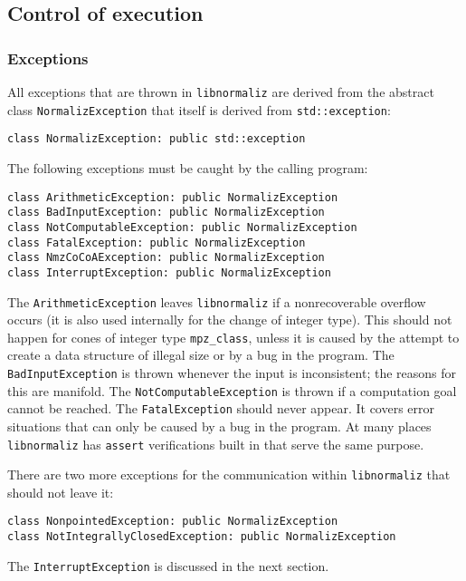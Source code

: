 \documentclass[12pt,a4paper]{scrartcl}
\theoremstyle{definition}
\begin{document}
\begin{small}
\subsection{Control of execution}

\subsubsection{Exceptions}

All exceptions that are thrown in \verb|libnormaliz| are derived from the abstract class \verb|NormalizException| that itself is derived from \verb|std::exception|:
\begin{Verbatim}
class NormalizException: public std::exception
\end{Verbatim}

The following exceptions must be caught by the calling program:
\begin{Verbatim}
class ArithmeticException: public NormalizException
class BadInputException: public NormalizException
class NotComputableException: public NormalizException
class FatalException: public NormalizException
class NmzCoCoAException: public NormalizException
class InterruptException: public NormalizException
\end{Verbatim}

The \verb|ArithmeticException| leaves \verb|libnormaliz| if a nonrecoverable overflow occurs (it is also used internally for the change of integer type). This should not happen for cones of integer type \verb|mpz_class|, unless it is caused by the attempt to create a data structure of illegal size or by a bug in the program. The \verb|BadInputException| is thrown whenever the input is inconsistent; the reasons for this are manifold. The \verb|NotComputableException| is thrown if a computation goal cannot be reached. The \verb|FatalException| should never appear. It covers error situations that can only be caused by a bug in the program. At many places \verb|libnormaliz| has \verb|assert| verifications built in that serve the same purpose.

There are two more exceptions for the communication within \verb|libnormaliz| that should not leave it:
\begin{Verbatim}
class NonpointedException: public NormalizException 
class NotIntegrallyClosedException: public NormalizException
\end{Verbatim}

The \verb|InterruptException| is discussed in the next section.


\end{small}
\end{document}
